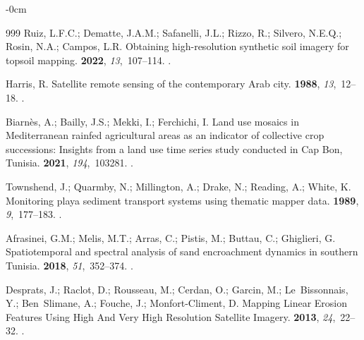 \documentclass[land,article,accept,pdftex,moreauthors]{Definitions/mdpi}
\begin{document}
\begin{adjustwidth}{-\extralength}{0cm}
\begin{thebibliography}{999}
Ruiz, L.F.C.; Dematte, J.A.M.; Safanelli, J.L.; Rizzo, R.; Silvero, N.E.Q.;
  Rosin, N.A.; Campos, L.R.
\newblock Obtaining high-resolution synthetic soil imagery for topsoil mapping.
 {\bf 2022}, {\em 13},~107--114.
.

Harris, R.
\newblock Satellite remote sensing of the contemporary Arab city.
 {\bf 1988}, {\em 13},~12--18.
.

Biarnès, A.; Bailly, J.S.; Mekki, I.; Ferchichi, I.
\newblock Land use mosaics in Mediterranean rainfed agricultural areas as an
  indicator of collective crop successions: Insights from a land use time
  series study conducted in Cap Bon, Tunisia.
 {\bf 2021}, {\em 194},~103281.
.

Townshend, J.; Quarmby, N.; Millington, A.; Drake, N.; Reading, A.; White, K.
\newblock Monitoring playa sediment transport systems using thematic mapper
  data.
 {\bf 1989}, {\em 9},~177--183.
.

Afrasinei, G.M.; Melis, M.T.; Arras, C.; Pistis, M.; Buttau, C.; Ghiglieri, G.
\newblock Spatiotemporal and spectral analysis of sand encroachment dynamics in
  southern Tunisia.
 {\bf 2018}, {\em
  51},~352--374.
.

Desprats, J.; Raclot, D.; Rousseau, M.; Cerdan, O.; Garcin, M.; Le~Bissonnais,
  Y.; Ben~Slimane, A.; Fouche, J.; Monfort-Climent, D.
\newblock Mapping Linear Erosion Features Using High And Very High Resolution
  Satellite Imagery.
 {\bf 2013}, {\em 24},~22--32.
.


\end{thebibliography}
\end{adjustwidth}
\end{document}
